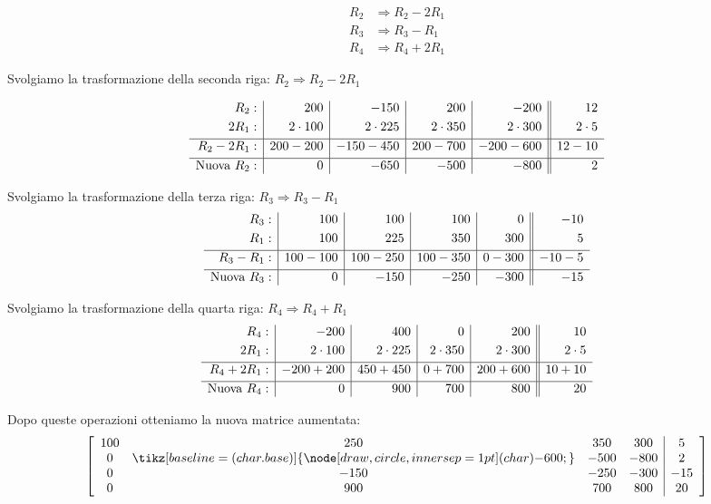 \begin{equation}
\begin{aligned}
R_2 &\Rightarrow R_2 - 2R_1 \\
R_3 &\Rightarrow R_3 - R_1 \\
R_4 &\Rightarrow R_4 + 2R_1
\end{aligned}
\end{equation}

Svolgiamo la trasformazione della seconda riga: $R_2 \Rightarrow R_2 - 2R_1$


\[
\begin{array}{r | r | r | r | r || r}
R_2: & 200 & -150 & 200 & -200 & 12 \\[1mm]
2 R_1: & 2 \cdot 100 & 2 \cdot 225 & 2 \cdot 350 & 2 \cdot 300 & 2 \cdot 5 \\[1mm]
\hline
 R_2 - 2R_1: & 200-200 & -150-450 & 200-700 & -200-600 & 12-10 \\[1mm]
\hline
\text{Nuova }R_2: & 0 & -650 & -500 & -800 & 2
\end{array}
\]
\vspace{0.5cm}


Svolgiamo la trasformazione della terza riga: $R_3 \Rightarrow R_3 - R_1$
\[
\begin{array}{r | r | r | r | r || r}
R_3: & 100 & 100 & 100 & 0 & -10 \\[1mm]
R_1: & 100 & 225 & 350 & 300 & 5 \\[1mm]
\hline
R_3 - R_1: & 100-100 & 100-250 & 100-350 & 0-300 & -10-5 \\[1mm]
\hline
\text{Nuova }R_3: & 0 & -150 & -250 & -300 & -15
\end{array}
\]
\vspace{0.5cm}


Svolgiamo la trasformazione della quarta riga: $R_4 \Rightarrow R_4 + R_1$
\[
\begin{array}{r | r | r | r | r || r}
R_4: & -200 & 400 & 0 & 200 & 10 \\[1mm]
2 R_1: & 2 \cdot 100 & 2 \cdot 225 & 2 \cdot 350 & 2 \cdot 300 & 2 \cdot 5 \\[1mm]
\hline
R_4 + 2R_1: & -200+200 & 450+450 & 0+700 & 200+600 & 10+10 \\[1mm]
\hline
\text{Nuova }R_4: & 0 & 900 & 700 & 800 & 20
\end{array}
\]

Dopo queste operazioni otteniamo la nuova matrice aumentata:
\begin{equation}
\left[
\begin{array}{cccc|c}
100 & 250 & 350 & 300 & 5 \\
0   & \tikz[baseline=(char.base)]{\node[draw,circle,inner sep=1pt] (char) {-600};} & -500 & -800 & 2 \\
0   & -150 & -250 & -300 & -15 \\
0   & 900  & 700  & 800  & 20
\end{array}
\right]
\label{mat: dopo primo pivot}
\end{equation}

